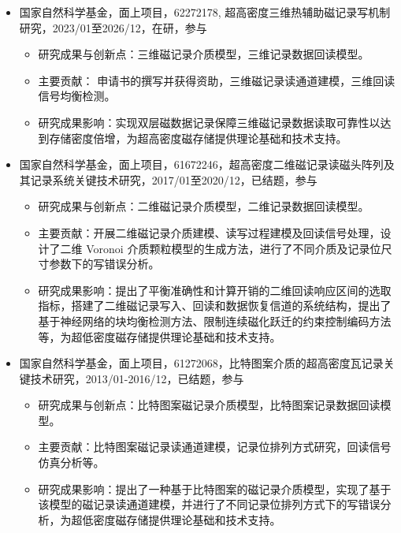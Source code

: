\documentclass[zh]{resume}
\begin{document}
\begin{itemize}
  \item 国家自然科学基金，面上项目，62272178, 超高密度三维热辅助磁记录写机制研究，2023/01至2026/12，在研，参与
  \begin{itemize}
    \item 研究成果与创新点：三维磁记录介质模型，三维记录数据回读模型。
    \item 主要贡献： 申请书的撰写并获得资助，三维磁记录读通道建模，三维回读信号均衡检测。
    \item 研究成果影响：实现双层磁数据记录保障三维磁记录数据读取可靠性以达到存储密度倍增，为超高密度磁存储提供理论基础和技术支持。
  \end{itemize}

  \item 国家自然科学基金，面上项目，61672246，超高密度二维磁记录读磁头阵列及其记录系统关键技术研究，2017/01至2020/12，已结题，参与
  \begin{itemize}
    \item 研究成果与创新点：二维磁记录介质模型，二维记录数据回读模型。
    \item 主要贡献：开展二维磁记录介质建模、读写过程建模及回读信号处理，设计了二维 Voronoi 介质颗粒模型的生成方法，进行了不同介质及记录位尺寸参数下的写错误分析。
    \item 研究成果影响：提出了平衡准确性和计算开销的二维回读响应区间的选取指标，搭建了二维磁记录写入、回读和数据恢复信道的系统结构，提出了基于神经网络的块均衡检测方法、限制连续磁化跃迁的约束控制编码方法等，为超低密度磁存储提供理论基础和技术支持。
  \end{itemize}

  \item 国家自然科学基金，面上项目，61272068，比特图案介质的超高密度瓦记录关键技术研究，2013/01-2016/12，已结题，参与
  \begin{itemize}
    \item 研究成果与创新点：比特图案磁记录介质模型，比特图案记录数据回读模型。
    \item 主要贡献：比特图案磁记录读通道建模，记录位排列方式研究，回读信号仿真分析等。
    \item 研究成果影响：提出了一种基于比特图案的磁记录介质模型，实现了基于该模型的磁记录读通道建模，并进行了不同记录位排列方式下的写错误分析，为超低密度磁存储提供理论基础和技术支持。
  \end{itemize}
  

\end{itemize}
\end{document}
